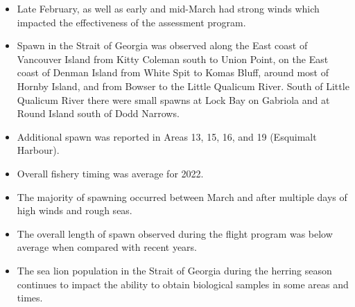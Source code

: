 \begin{itemize}

\item Late February, as well as early and mid-March had strong winds
which impacted the effectiveness of the assessment program.

\item Spawn in the Strait of Georgia was observed
along the East coast of Vancouver Island from Kitty Coleman south to Union Point,
on the East coast of Denman Island from White Spit to Komas Bluff,
around most of Hornby Island,
and from Bowser to the Little Qualicum River.
South of Little Qualicum River there were small spawns
at Lock Bay on Gabriola and at Round Island south of Dodd Narrows. 

\item Additional spawn was reported in Areas 13, 15, 16, and 19 (Esquimalt Harbour).

\item Overall fishery timing was average for 2022.

\item The majority of spawning occurred between March  and 
after multiple days of high winds and rough seas.

\item The overall length of spawn observed during the flight program
was below average when compared with recent years.

\item The sea lion population in the Strait of Georgia during the herring season
continues to impact the ability to obtain biological samples in some areas and times.

\end{itemize}